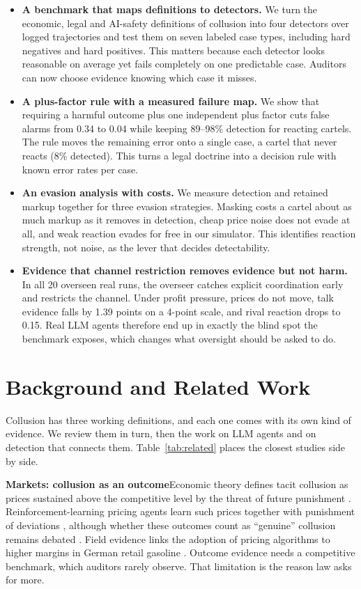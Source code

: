 \documentclass[10pt]{article}
\newcommand{\para}[1]{\textbf{#1}\hspace{0.45em}}
\begin{document}
\begin{itemize}[leftmargin=1.2em,itemsep=2pt]
\item \textbf{A benchmark that maps definitions to detectors.} We turn the economic, legal and AI-safety definitions of collusion into four detectors over logged trajectories and test them on seven labeled case types, including hard negatives and hard positives. This matters because each detector looks reasonable on average yet fails completely on one predictable case. Auditors can now choose evidence knowing which case it misses.
\item \textbf{A plus-factor rule with a measured failure map.} We show that requiring a harmful outcome plus one independent plus factor cuts false alarms from 0.34 to 0.04 while keeping 89--98\% detection for reacting cartels. The rule moves the remaining error onto a single case, a cartel that never reacts (8\% detected). This turns a legal doctrine into a decision rule with known error rates per case.
\item \textbf{An evasion analysis with costs.} We measure detection and retained markup together for three evasion strategies. Masking costs a cartel about as much markup as it removes in detection, cheap price noise does not evade at all, and weak reaction evades for free in our simulator. This identifies reaction strength, not noise, as the lever that decides detectability.
\item \textbf{Evidence that channel restriction removes evidence but not harm.} In all 20 overseen real runs, the overseer catches explicit coordination early and restricts the channel. Under profit pressure, prices do not move, talk evidence falls by 1.39 points on a 4-point scale, and rival reaction drops to 0.15. Real LLM agents therefore end up in exactly the blind spot the benchmark exposes, which changes what oversight should be asked to do.
\end{itemize}

\section{Background and Related Work}
\label{sec:related}

Collusion has three working definitions, and each one comes with its own kind of evidence. We review them in turn, then the work on LLM agents and on detection that connects them. Table~\ref{tab:related} places the closest studies side by side.

\para{Markets: collusion as an outcome}Economic theory defines tacit collusion as prices sustained above the competitive level by the threat of future punishment \citep{stigler,greenporter,ivaldi}. Reinforcement-learning pricing agents learn such prices together with punishment of deviations \citep{calvano}, although whether these outcomes count as ``genuine'' collusion remains debated \citep{calvano23}. Field evidence links the adoption of pricing algorithms to higher margins in German retail gasoline \citep{assad}. Outcome evidence needs a competitive benchmark, which auditors rarely observe. That limitation is the reason law asks for more.
\end{document}
